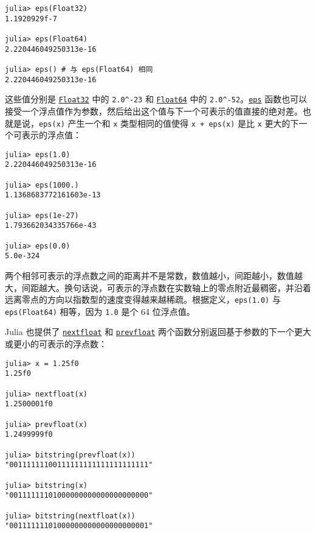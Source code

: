 \begin{verbatim}
julia> eps(Float32)
1.1920929f-7

julia> eps(Float64)
2.220446049250313e-16

julia> eps() # 与 eps(Float64) 相同
2.220446049250313e-16
\end{verbatim}



这些值分别是 \hyperlink{8101639384272933082}{\texttt{Float32}} 中的 \texttt{2.0{\textasciicircum}-23} 和 \hyperlink{5027751419500983000}{\texttt{Float64}} 中的 \texttt{2.0{\textasciicircum}-52}。\hyperlink{4594213520310841636}{\texttt{eps}} 函数也可以接受一个浮点值作为参数，然后给出这个值与下一个可表示的值直接的绝对差。也就是说，\texttt{eps(x)} 产生一个和 \texttt{x} 类型相同的值使得 \texttt{x + eps(x)} 是比 \texttt{x} 更大的下一个可表示的浮点值：




\begin{verbatim}
julia> eps(1.0)
2.220446049250313e-16

julia> eps(1000.)
1.1368683772161603e-13

julia> eps(1e-27)
1.793662034335766e-43

julia> eps(0.0)
5.0e-324
\end{verbatim}



两个相邻可表示的浮点数之间的距离并不是常数，数值越小，间距越小，数值越大，间距越大。换句话说，可表示的浮点数在实数轴上的零点附近最稠密，并沿着远离零点的方向以指数型的速度变得越来越稀疏。根据定义，\texttt{eps(1.0)} 与 \texttt{eps(Float64)} 相等，因为 \texttt{1.0} 是个 64 位浮点值。



Julia 也提供了 \hyperlink{8339500090035450608}{\texttt{nextfloat}} 和 \hyperlink{14035790731013288499}{\texttt{prevfloat}} 两个函数分别返回基于参数的下一个更大或更小的可表示的浮点数：




\begin{verbatim}
julia> x = 1.25f0
1.25f0

julia> nextfloat(x)
1.2500001f0

julia> prevfloat(x)
1.2499999f0

julia> bitstring(prevfloat(x))
"00111111100111111111111111111111"

julia> bitstring(x)
"00111111101000000000000000000000"

julia> bitstring(nextfloat(x))
"00111111101000000000000000000001"
\end{verbatim}




